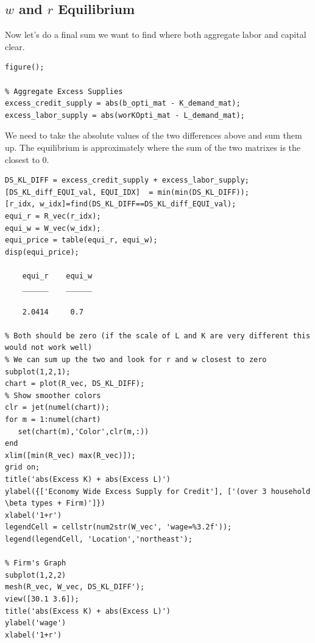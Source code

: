 \documentclass[
]{book}
\begin{document}
\hypertarget{w-and-r-equilibrium}{%
\subsection{\texorpdfstring{\(w\) and \(r\) Equilibrium}{w and r Equilibrium}}\label{w-and-r-equilibrium}}

Now let's do a final sum we want to find where both aggregate labor and
capital clear.

\begin{verbatim}
figure();

% Aggregate Excess Supplies
excess_credit_supply = abs(b_opti_mat - K_demand_mat);
excess_labor_supply = abs(worKOpti_mat - L_demand_mat);
\end{verbatim}

We need to take the absolute values of the two differences above and sum
them up. The equilibrium is approximately where the sum of the two
matrixes is the closest to \(0\).

\begin{verbatim}
DS_KL_DIFF = excess_credit_supply + excess_labor_supply;
[DS_KL_diff_EQUI_val, EQUI_IDX]  = min(min(DS_KL_DIFF));
[r_idx, w_idx]=find(DS_KL_DIFF==DS_KL_diff_EQUI_val);
equi_r = R_vec(r_idx);
equi_w = W_vec(w_idx);
equi_price = table(equi_r, equi_w);
disp(equi_price);

    equi_r    equi_w
    ______    ______

    2.0414     0.7  

% Both should be zero (if the scale of L and K are very different this would not work well)
% We can sum up the two and look for r and w closest to zero
subplot(1,2,1);
chart = plot(R_vec, DS_KL_DIFF);
% Show smoother colors
clr = jet(numel(chart));
for m = 1:numel(chart)
   set(chart(m),'Color',clr(m,:))
end
xlim([min(R_vec) max(R_vec)]);
grid on;
title('abs(Excess K) + abs(Excess L)')
ylabel({['Economy Wide Excess Supply for Credit'], ['(over 3 household \beta types + Firm)']})
xlabel('1+r')
legendCell = cellstr(num2str(W_vec', 'wage=%3.2f'));
legend(legendCell, 'Location','northeast');

% Firm's Graph
subplot(1,2,2)
mesh(R_vec, W_vec, DS_KL_DIFF');
view([30.1 3.6]);
title('abs(Excess K) + abs(Excess L)')
ylabel('wage')
xlabel('1+r')
\end{verbatim}
\end{document}
